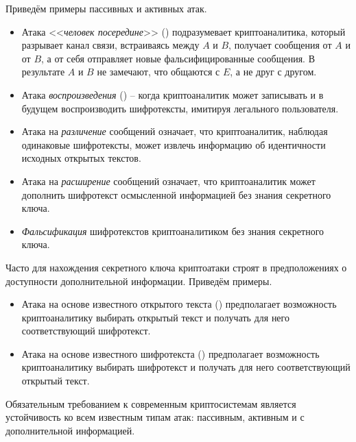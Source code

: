 Приведём примеры пассивных и активных атак.
\begin{itemize}
    \item Атака <<\emph{человек посередине}>> () подразумевает криптоаналитика, который разрывает канал связи, встраиваясь между $A$ и $B$, получает сообщения от $A$ и от $B$, а от себя отправляет новые фальсифицированные сообщения. В результате $A$ и $B$ не замечают, что общаются с $E$, а не друг с другом.
    \item Атака \emph{воспроизведения} () -- когда криптоаналитик может записывать и в будущем воспроизводить шифротексты, имитируя легального пользователя.
    \item Атака на \emph{различение} сообщений означает, что криптоаналитик, наблюдая одинаковые шифротексты, может извлечь информацию об идентичности исходных открытых текстов.
    \item Атака на \emph{расширение} сообщений означает, что криптоаналитик может дополнить шифротекст осмысленной информацией без знания секретного ключа.
    \item \emph{Фальсификация} шифротекстов криптоаналитиком без знания секретного ключа.
\end{itemize}

Часто для нахождения секретного ключа криптоатаки строят в предположениях о доступности дополнительной информации. Приведём примеры.
\begin{itemize}
    \item Атака на основе известного открытого текста () предполагает возможность криптоаналитику выбирать открытый текст и получать для него соответствующий шифротекст.
    \item Атака на основе известного шифротекста () предполагает возможность криптоаналитику выбирать шифротекст и получать для него соответствующий открытый текст.
\end{itemize}

Обязательным требованием к современным криптосистемам является устойчивость ко всем известным типам атак: пассивным, активным и с дополнительной информацией.


%

